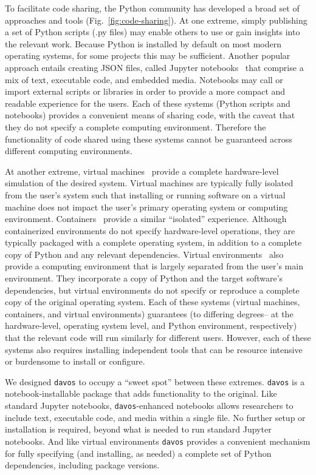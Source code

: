 \documentclass[preprint,12pt, a4paper]{elsarticle}
\begin{document}
To facilitate code sharing, the Python community has developed a broad
set of approaches and tools (Fig.~\ref{fig:code-sharing}).  At one
extreme, simply publishing a set of Python scripts (.py files) may
enable others to use or gain insights into the relevant work.  Because
Python is installed by default on most modern operating systems, for
some projects this may be sufficient.  Another popular approach entails
creating JSON files, called Jupyter notebooks~\citep{KluyEtal16} that
comprise a mix of text, executable code, and embedded media.
Notebooks may call or import external scripts or libraries in order to
provide a more compact and readable experience for the users.  Each of
these systems (Python scripts and notebooks) provides a convenient
means of sharing code, with the caveat that they do not specify a
complete computing environment.  Therefore the functionality of code
shared using these systems cannot be guaranteed across different
computing environments.

At another extreme, virtual machines~\citep{Gold74, AltiEtal05, vmware} provide a complete hardware-level
simulation of the desired system.  Virtual machines are typically
fully isolated from the user's system such that installing or running
software on a virtual machine does not impact the user's primary
operating system or computing environment.  Containers~\citep[e.g.,][]{Merk14,
  KurtEtal17} provide a similar ``isolated'' experience.  Although
containerized environments do not specify hardware-level operations,
they are typically packaged with a complete operating system, in
addition to a complete copy of Python and any relevant dependencies.
Virtual environments~\citep[e.g.,][]{vanREtal14} also provide a
computing environment that is largely separated from the user's main
environment.  They incorporate a copy of Python and the target
software's dependencies, but virtual environments do not specify or
reproduce a complete copy of the original operating system.  Each of
these systems (virtual machines, containers, and virtual environments)
guarantees (to differing degrees-- at the hardware-level, operating system
level, and Python environment, respectively) that the relevant code
will run similarly for different users.  However, each of these
systems also requires installing independent tools that
can be resource intensive or burdensome to install or configure.

We designed \texttt{davos} to occupy a ``sweet spot'' between these
extremes.  \texttt{davos} is a notebook-installable package that adds
functionality to the original.  Like standard Jupyter notebooks,
\texttt{davos}-enhanced notebooks allows researchers to include text,
executable code, and media within a single file.  No further setup or
installation is required, beyond what is needed to run standard
Jupyter notebooks.  And like virtual environments \texttt{davos}
provides a convenient mechanism for fully specifying (and installing,
as needed) a complete set of Python dependencies, including package versions.
\end{document}

